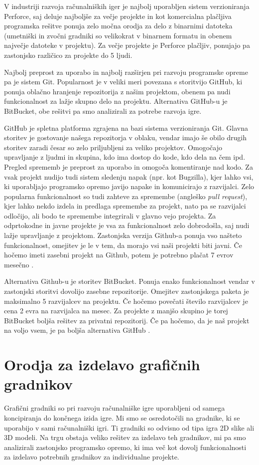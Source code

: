 \documentclass[12pt,a4paper,twoside]{book}
\begin{document}
V industriji razvoja računalniških iger je najbolj uporabljen sistem verzioniranja Perforce, saj deluje najboljše za večje projekte in kot komercialna plačljiva programska rešitve ponuja zelo močna orodja za delo z binarnimi datoteka (umetniški in zvočni gradniki so velikokrat v binarnem formatu in obenem največje datoteke v projektu). Za večje projekte je Perforce plačljiv, ponujajo pa zastonjsko različico za projekte do 5 ljudi.

Najbolj preprost za uporabo in najbolj razširjen pri razvoju programske opreme pa je sistem Git. Popularnost je v veliki meri povezana s storitvijo GitHub, ki ponuja oblačno hranjenje repozitorija z našim projektom, obenem pa nudi funkcionalnost za lažje skupno delo na projektu. Alternativa GitHub-u je BitBucket, obe rešitvi pa smo analizirali za potrebe razvoja igre.

GitHub je spletna platforma zgrajena na bazi sistema verzioniranja Git. Glavna storitev je gostovanje našega repozitorja v oblaku, vendar imajo še obilo drugih storitev zaradi česar so zelo priljubljeni za veliko projektov. Omogočajo upravljanje z ljudmi in skupina, kdo ima dostop do kode, kdo dela na čem ipd. Pregled sprememb je preprost za uporabo in omogoča komentiranje nad kodo. Za vsak projekt nudijo tudi sistem sledenju napak (npr. kot Bugzilla), kjer lahko vsi, ki uporabljajo programsko opremo javijo napake in komunicirajo z razvijalci. Zelo popularna funkcionalnost so tudi zahteve za spremembe (angleško \textit{pull request}), kjer lahko nekdo izdela in predlaga spremembe za projekt, nato pa se razvijalci odločijo, ali bodo te spremembe integrirali v glavno vejo projekta. Za odprtokodne in javne projekte je vsa za funkcionalnost zelo dobrodošla, saj nudi lažje upravljanje z projektom. Zastonjska verzija Github-a ponuja vso našteto funkcionalnost, omejitev je le v tem, da morajo vsi naši projekti biti javni. Če hočemo imeti zasebni projekt na Github, potem je potrebno plačat 7 evrov mesečno \cite{github}.

Alternativa Github-u je storitev BitBucket. Ponuja enako funkcionalnost vendar v zastonjski storitvi dovolijo zasebne repozitorije. Omejitev zastonjskega paketa je maksimalno 5 razvijalcev na projektu. Če hočemo povečati število razvijalcev je cena 2 evra na razvijalca na mesec. Za projekte z manjšo skupino je torej BitBucket boljša rešitev za privatni repozitorij. Če pa hočemo, da je naš projekt na voljo vsem, je pa boljša alternativa GitHub \cite{bitBucket}.

\section{Orodja za izdelavo grafičnih gradnikov}
Grafični gradniki so pri razvoju računalniške igre uporabljeni od samega koncipiranja do končnega izida igre. Mi smo se osredotočili na gradnike, ki se uporabijo v sami računalniški igri. Ti gradniki so odvisno od tipa igra 2D slike ali 3D modeli. Na trgu obstaja veliko rešitev za izdelavo teh gradnikov, mi pa smo analizirali zastonjsko programsko opremo, ki ima več kot dovolj funkcionalnosti za izdelavo potrebnih gradnikov za individualne projekte.
\end{document}
